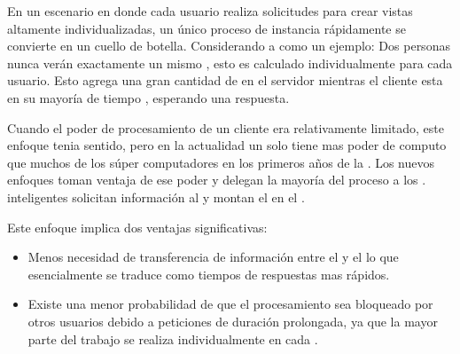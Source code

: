 En un escenario en donde cada usuario realiza solicitudes para crear vistas altamente individualizadas, un único proceso de instancia rápidamente se convierte en un cuello de botella. Considerando a \facebook como un ejemplo: Dos personas nunca verán exactamente un mismo \facebookwall, esto es calculado individualmente para cada usuario. Esto agrega una gran cantidad de \stress en el servidor mientras el cliente esta en su mayoría de tiempo \idle, esperando una respuesta.

Cuando el poder de procesamiento de un cliente era relativamente limitado, este enfoque tenia sentido, pero en la actualidad un solo \smartphone tiene mas poder de computo que muchos de los súper computadores en los primeros años de la \web. Los nuevos enfoques toman ventaja de ese poder y delegan la mayoría del proceso a los \clientsAS. \frontEndsAS inteligentes solicitan información al \serverAS y montan el \htmldom en el \browser.

Este enfoque \clientcentric implica dos ventajas significativas:
\begin{itemize}
	\item Menos necesidad de transferencia de información entre el \serverAS y el \clientAS lo que esencialmente se traduce como tiempos de respuestas mas rápidos.
	\item Existe una menor probabilidad de que el procesamiento sea bloqueado por otros usuarios debido a peticiones de duración prolongada, ya que la mayor parte del trabajo se realiza individualmente en cada \clientAS.
\end{itemize}

